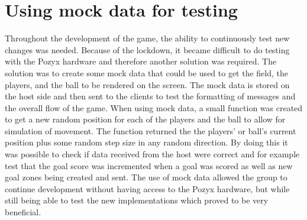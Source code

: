 \section{Using mock data for testing}
Throughout the development of the game, the ability to continuously test new changes was needed.
Because of the lockdown, it became difficult to do testing with the Pozyx hardware and therefore another solution was required.
The solution was to create some mock data that could be used to get the field, the players, and the ball to be rendered on the screen.
The mock data is stored on the host side and then sent to the clients to test the formatting of messages and the overall flow of the game.
When using mock data, a small function was created to get a new random position for each of the players and the ball to allow for simulation of movement.
The function returned the the players' or ball's current position plus some random step size in any random direction.
By doing this it was possible to check if data received from the host were correct and for example test that the goal score was incremented when a goal was scored as well as new goal zones being created and sent.
The use of mock data allowed the group to continue development without having access to the Pozyx hardware, but while still being able to test the new implementations which proved to be very beneficial.